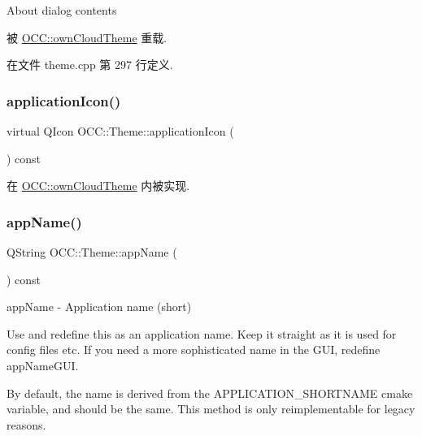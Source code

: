 About dialog contents 

被 \hyperlink{class_o_c_c_1_1own_cloud_theme_a421c900cd70e33ade914a2066cb9b55c}{O\+C\+C\+::own\+Cloud\+Theme} 重载.



在文件 theme.\+cpp 第 297 行定义.

\mbox{\label{class_o_c_c_1_1_theme_a379b81bad736957d69add51e2355be38}} 
\subsubsection{\texorpdfstring{application\+Icon()}{applicationIcon()}}
{\footnotesize\ttfamily virtual Q\+Icon O\+C\+C\+::\+Theme\+::application\+Icon (\begin{DoxyParamCaption}{ }\end{DoxyParamCaption}) const\hspace{0.3cm}{\ttfamily [pure virtual]}}



在 \hyperlink{class_o_c_c_1_1own_cloud_theme_a45975f531c5c2c1f7e699f53d55d786e}{O\+C\+C\+::own\+Cloud\+Theme} 内被实现.

\mbox{\label{class_o_c_c_1_1_theme_a08bc5c6b79f6680e58c4b3eebe7cad77}} 
\subsubsection{\texorpdfstring{app\+Name()}{appName()}}
{\footnotesize\ttfamily Q\+String O\+C\+C\+::\+Theme\+::app\+Name (\begin{DoxyParamCaption}{ }\end{DoxyParamCaption}) const\hspace{0.3cm}{\ttfamily [virtual]}}



app\+Name -\/ Application name (short) 

Use and redefine this as an application name. Keep it straight as it is used for config files etc. If you need a more sophisticated name in the G\+UI, redefine app\+Name\+G\+UI.

By default, the name is derived from the A\+P\+P\+L\+I\+C\+A\+T\+I\+O\+N\+\_\+\+S\+H\+O\+R\+T\+N\+A\+ME cmake variable, and should be the same. This method is only reimplementable for legacy reasons.

